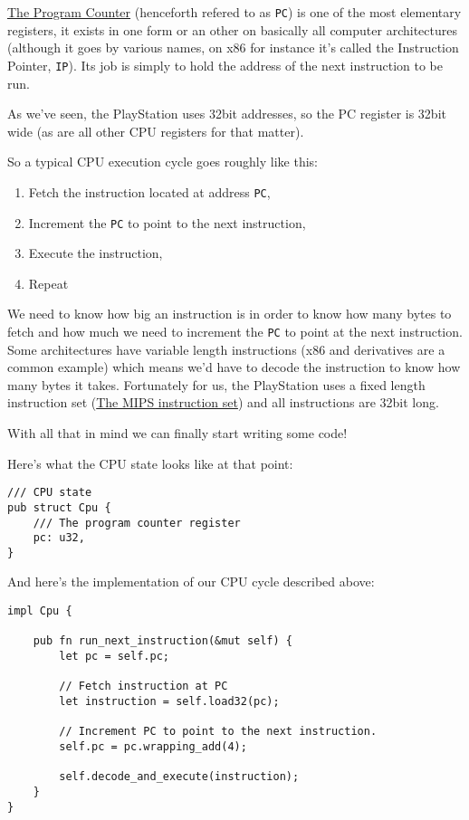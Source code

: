 \documentclass{article}
\begin{document}
\href{https://en.wikipedia.org/wiki/Program_counter}{The Program
  Counter} (henceforth refered to as \texttt{PC}) is one of the most
elementary registers, it exists in one form or an other on basically
all computer architectures (although it goes by various names, on x86
for instance it's called the Instruction Pointer, \texttt{IP}). Its
job is simply to hold the address of the next instruction to be run.

As we've seen, the PlayStation uses 32bit addresses, so the PC
register is 32bit wide (as are all other CPU registers for that
matter).

So a typical CPU execution cycle goes roughly like this:

\begin{enumerate}
  \item Fetch the instruction located at address \texttt{PC},
  \item Increment the \texttt{PC} to point to the next instruction,
  \item Execute the instruction,
  \item Repeat
\end{enumerate}

We need to know how big an instruction is in order to know how many
bytes to fetch and how much we need to increment the \texttt{PC} to
point at the next instruction. Some architectures have variable length
instructions (x86 and derivatives are a common example) which means
we'd have to decode the instruction to know how many bytes it
takes. Fortunately for us, the PlayStation uses a fixed length
instruction set
(\href{https://en.wikipedia.org/wiki/MIPS_instruction_set}{The MIPS
  instruction set}) and all instructions are 32bit long.

With all that in mind we can finally start writing some code!

Here's what the CPU state looks like at that point:

\begin{lstlisting}
/// CPU state
pub struct Cpu {
    /// The program counter register
    pc: u32,
}
\end{lstlisting}

And here's the implementation of our CPU cycle described above:

\begin{lstlisting}
impl Cpu {

    pub fn run_next_instruction(&mut self) {
        let pc = self.pc;

        // Fetch instruction at PC
        let instruction = self.load32(pc);

        // Increment PC to point to the next instruction.
        self.pc = pc.wrapping_add(4);

        self.decode_and_execute(instruction);
    }
}
\end{lstlisting}
\end{document}
